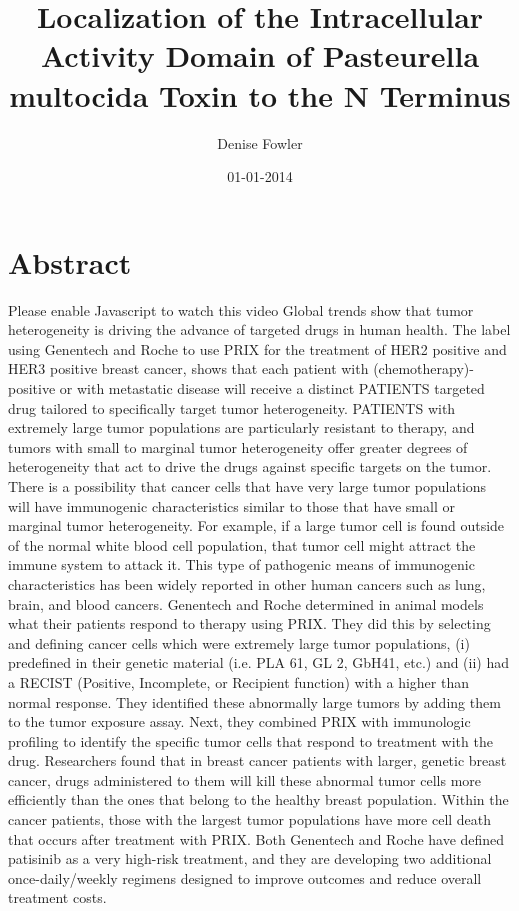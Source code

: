 \documentclass{article}%
\title{Localization of the Intracellular Activity Domain of Pasteurella multocida Toxin to the N Terminus}%
\author{Denise Fowler}%
\affil{School of Dentistry, Chung Shan Medical University, Taichung 40201, Taiwan}%
\date{01{-}01{-}2014}%
\begin{document}
%
\normalsize%
\maketitle%
\section{Abstract}%
\label{sec:Abstract}%
Please enable Javascript to watch this video\newline%
Global trends show that tumor heterogeneity is driving the advance of targeted drugs in human health. The label using Genentech and Roche to use PRIX for the treatment of HER2 positive and HER3 positive breast cancer, shows that each patient with (chemotherapy){-}positive or with metastatic disease will receive a distinct PATIENTS targeted drug tailored to specifically target tumor heterogeneity.\newline%
PATIENTS with extremely large tumor populations are particularly resistant to therapy, and tumors with small to marginal tumor heterogeneity offer greater degrees of heterogeneity that act to drive the drugs against specific targets on the tumor.\newline%
There is a possibility that cancer cells that have very large tumor populations will have immunogenic characteristics similar to those that have small or marginal tumor heterogeneity. For example, if a large tumor cell is found outside of the normal white blood cell population, that tumor cell might attract the immune system to attack it. This type of pathogenic means of immunogenic characteristics has been widely reported in other human cancers such as lung, brain, and blood cancers.\newline%
Genentech and Roche determined in animal models what their patients respond to therapy using PRIX. They did this by selecting and defining cancer cells which were extremely large tumor populations, (i) predefined in their genetic material (i.e. PLA 61, GL 2, GbH41, etc.) and (ii) had a RECIST (Positive, Incomplete, or Recipient function) with a higher than normal response. They identified these abnormally large tumors by adding them to the tumor exposure assay. Next, they combined PRIX with immunologic profiling to identify the specific tumor cells that respond to treatment with the drug.\newline%
Researchers found that in breast cancer patients with larger, genetic breast cancer, drugs administered to them will kill these abnormal tumor cells more efficiently than the ones that belong to the healthy breast population. Within the cancer patients, those with the largest tumor populations have more cell death that occurs after treatment with PRIX.\newline%
Both Genentech and Roche have defined patisinib as a very high{-}risk treatment, and they are developing two additional once{-}daily/weekly regimens designed to improve outcomes and reduce overall treatment costs.
\end{document}
